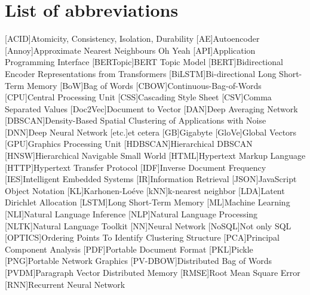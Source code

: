 \chapter*{List of abbreviations}

\begin{acronym}[XXXXXXXXX]
    [ACID]{Atomicity, Consistency, Isolation, Durability}
    [AE]{Autoencoder}
    [Annoy]{Approximate Nearest Neighbours Oh Yeah}
    [API]{Application Programming Interface}
    [BERTopic]{BERT Topic Model}
    [BERT]{Bidirectional Encoder Representations from Transformers}
    [BiLSTM]{Bi-directional Long Short-Term Memory}
    [BoW]{Bag of Words}
    [CBOW]{Continuous-Bag-of-Words}
    [CPU]{Central Processing Unit}
    [CSS]{Cascading Style Sheet}
    [CSV]{Comma Separated Values}
    [Doc2Vec]{Document to Vector}
    [DAN]{Deep Averaging Network}
    [DBSCAN]{Density-Based Spatial Clustering of Applications with Noise}
    [DNN]{Deep Neural Network}
    [etc.]{et cetera}    
    [GB]{Gigabyte}
    [GloVe]{Global Vectors}
    [GPU]{Graphics Processing Unit}
    [HDBSCAN]{Hierarchical DBSCAN}
    [HNSW]{Hierarchical Navigable Small World}
    [HTML]{Hypertext Markup Language}
    [HTTP]{Hypertext Transfer Protocol}
    [IDF]{Inverse Document Frequency}
    [IES]{Intelligent Embedded Systems}
    [IR]{Information Retrieval}
    [JSON]{JavaScript Object Notation}
    [KL]{Karhonen-Loéve}
    [kNN]{k-nearest neighbor}
    [LDA]{Latent Dirichlet Allocation}
    [LSTM]{Long Short-Term Memory}
    [ML]{Machine Learning}
    [NLI]{Natural Language Inference}
    [NLP]{Natural Language Processing}
    [NLTK]{Natural Language Toolkit}
    [NN]{Neural Network}
    [NoSQL]{Not only SQL}
    [OPTICS]{Ordering Points To Identify Clustering Structure}
    [PCA]{Principal Component Analysis}
    [PDF]{Portable Document Format}
    [PKL]{Pickle}
    [PNG]{Portable Network Graphics}
    [PV-DBOW]{Distributed Bag of Words}
    [PVDM]{Paragraph Vector Distributed Memory}
    [RMSE]{Root Mean Square Error}
    [RNN]{Recurrent Neural Network}

\end{acronym}
